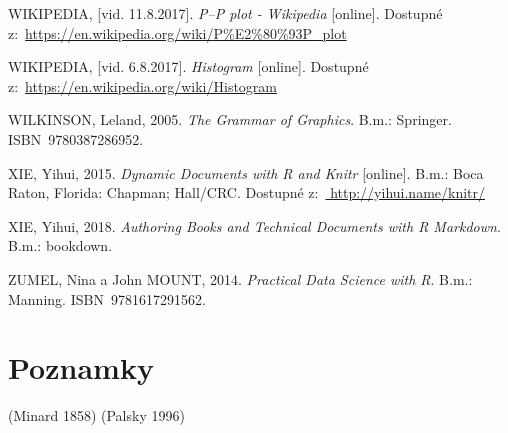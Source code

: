 \documentclass[12pt,]{article}
\begin{document}
\hypertarget{ref-pp_wiki}{}
WIKIPEDIA, {[}vid. 11.8.2017{]}. \emph{P--P plot - Wikipedia}
{[}online{]}. Dostupné
z:~\url{https://en.wikipedia.org/wiki/P\%E2\%80\%93P_plot}

\hypertarget{ref-hist_wiki}{}
WIKIPEDIA, {[}vid. 6.8.2017{]}. \emph{Histogram} {[}online{]}. Dostupné
z:~\url{https://en.wikipedia.org/wiki/Histogram}

\hypertarget{ref-wilkinson2005}{}
WILKINSON, Leland, 2005. \emph{The Grammar of Graphics}. B.m.: Springer.
ISBN~9780387286952.

\hypertarget{ref-knitr}{}
XIE, Yihui, 2015. \emph{Dynamic Documents with R and Knitr}
{[}online{]}. B.m.: Boca Raton, Florida: Chapman; Hall/CRC. Dostupné
z:~\href{\%20http://yihui.name/knitr/}{ http://yihui.name/knitr/}

\hypertarget{ref-rmd:bookdown}{}
XIE, Yihui, 2018. \emph{Authoring Books and Technical Documents with R
Markdown}. B.m.: bookdown.

\hypertarget{ref-zumel_2014}{}
ZUMEL, Nina a John MOUNT, 2014. \emph{Practical Data Science with R}.
B.m.: Manning. ISBN~9781617291562.

\newpage

\section*{Poznamky}

\thispagestyle{empty}

(Minard 1858) (Palsky 1996)
\end{document}
